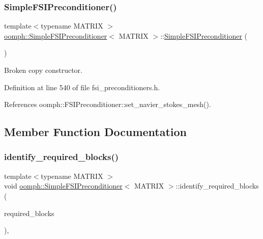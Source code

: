 \subsubsection{\texorpdfstring{Simple\+F\+S\+I\+Preconditioner()}{SimpleFSIPreconditioner()}\hspace{0.1cm}{\footnotesize\ttfamily [2/2]}}
{\footnotesize\ttfamily template$<$typename M\+A\+T\+R\+IX $>$ \\
\hyperlink{classoomph_1_1SimpleFSIPreconditioner}{oomph\+::\+Simple\+F\+S\+I\+Preconditioner}$<$ M\+A\+T\+R\+IX $>$\+::\hyperlink{classoomph_1_1SimpleFSIPreconditioner}{Simple\+F\+S\+I\+Preconditioner} (\begin{DoxyParamCaption}\item[{const \hyperlink{classoomph_1_1SimpleFSIPreconditioner}{Simple\+F\+S\+I\+Preconditioner}$<$ M\+A\+T\+R\+IX $>$ \&}]{ }\end{DoxyParamCaption})\hspace{0.3cm}{\ttfamily [inline]}}



Broken copy constructor. 



Definition at line 540 of file fsi\+\_\+preconditioners.\+h.



References oomph\+::\+F\+S\+I\+Preconditioner\+::set\+\_\+navier\+\_\+stokes\+\_\+mesh().



\subsection{Member Function Documentation}
\mbox{\label{classoomph_1_1SimpleFSIPreconditioner_abaf505c05ec128f4c3c6ff5036fb3db1}} 
\subsubsection{\texorpdfstring{identify\+\_\+required\+\_\+blocks()}{identify\_required\_blocks()}}
{\footnotesize\ttfamily template$<$typename M\+A\+T\+R\+IX $>$ \\
void \hyperlink{classoomph_1_1SimpleFSIPreconditioner}{oomph\+::\+Simple\+F\+S\+I\+Preconditioner}$<$ M\+A\+T\+R\+IX $>$\+::identify\+\_\+required\+\_\+blocks (\begin{DoxyParamCaption}\item[{Dense\+Matrix$<$ bool $>$ \&}]{required\+\_\+blocks }\end{DoxyParamCaption})\hspace{0.3cm}{\ttfamily [private]}, {\ttfamily [virtual]}}



